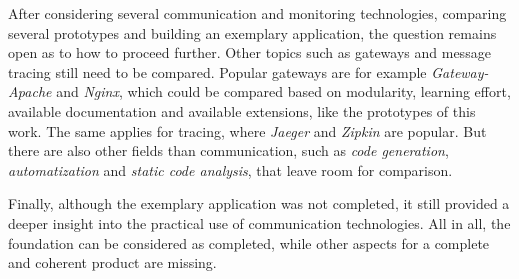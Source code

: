 After considering several communication and monitoring technologies, comparing several prototypes and building an exemplary application, the question remains open as to how to proceed further.
Other topics such as gateways and message tracing still need to be compared.
Popular gateways are for example \textit{Gateway-Apache} and \textit{Nginx}, which could be compared based on modularity, learning effort, available documentation and available extensions, like the prototypes of this work.
The same applies for tracing, where \textit{Jaeger} and \textit{Zipkin} are popular.
But there are also other fields than communication, such as \textit{code generation}, \textit{automatization} and \textit{static code analysis}, that leave room for comparison.

Finally, although the exemplary application was not completed, it still provided a deeper insight into the practical use of communication technologies.
All in all, the foundation can be considered as completed, while other aspects for a complete and coherent product are missing.

